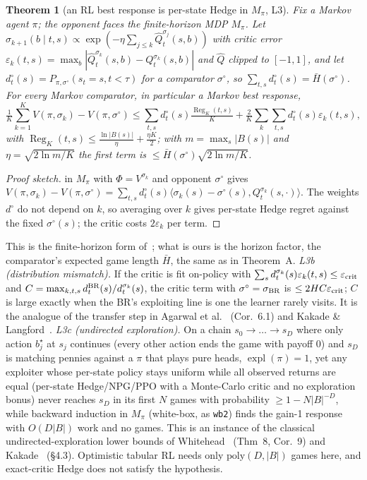 \documentclass[10pt]{article}
\theoremstyle{plain}
\newtheorem{theorem}{Theorem}
\theoremstyle{definition}
\theoremstyle{remark}
\newcommand{\Hbar}{\bar H}
\DeclareMathOperator{\expl}{expl}
\DeclareMathOperator{\Reg}{Reg}
\begin{document}
\begin{theorem}[an RL best response is per-state Hedge in $M_\pi$, L3]\label{thm:L3}
Fix a Markov agent $\pi$; the opponent faces the finite-horizon MDP $M_\pi$. Let $\sigma_{k+1}(b\mid t,s)\propto\exp(-\eta\sum_{j\le k}\hat Q^{\sigma_j}_t(s,b))$ with critic error $\varepsilon_k(t,s)=\max_b|\hat Q^{\sigma_k}_t(s,b)-Q^{\sigma_k}_t(s,b)|$ and $\hat Q$ clipped to $[-1,1]$, and let $d^\circ_t(s)=P_{\pi,\sigma^\circ}(s_t=s,t<\tau)$ for a comparator $\sigma^\circ$, so $\sum_{t,s}d^\circ_t(s)=\Hbar(\sigma^\circ)$. For every Markov comparator, in particular a Markov best response,
\[\tfrac1K\sum_{k=1}^KV(\pi,\sigma_k)-V(\pi,\sigma^\circ)\le\sum_{t,s}d^\circ_t(s)\tfrac{\Reg_K(t,s)}{K}+\tfrac2K\sum_k\sum_{t,s}d^\circ_t(s)\varepsilon_k(t,s),\]
with $\Reg_K(t,s)\le\frac{\ln|B(s)|}\eta+\frac{\eta K}2$; with $m=\max_s|B(s)|$ and $\eta=\sqrt{2\ln m/K}$ the first term is $\le\Hbar(\sigma^\circ)\sqrt{2\ln m/K}$.
\end{theorem}
\begin{proof}[Proof sketch]
 in $M_\pi$ with $\Phi=V^{\sigma_k}$ and opponent $\sigma^\circ$ gives $V(\pi,\sigma_k)-V(\pi,\sigma^\circ)=\sum_{t,s}d^\circ_t(s)\langle\sigma_k(s)-\sigma^\circ(s),Q^{\sigma_k}_t(s,\cdot)\rangle$. The weights $d^\circ$ do not depend on $k$, so averaging over $k$ gives per-state Hedge regret against the fixed $\sigma^\circ(s)$; the critic costs $2\varepsilon_k$ per term.
\end{proof}
This is the finite-horizon form of~\cite{EKM09,Aga21}; what is ours is the horizon factor, the comparator's expected game length $\Hbar$, the same as in Theorem~A.
\emph{L3b (distribution mismatch).} If the critic is fit on-policy with $\sum_sd^{\sigma_k}_t(s)\varepsilon_k(t,s)\le\varepsilon_{\rm crit}$ and $C=\max_{k,t,s}d^{\rm BR}_t(s)/d^{\sigma_k}_t(s)$, the critic term with $\sigma^\circ=\sigma_{\rm BR}$ is $\le2HC\varepsilon_{\rm crit}$; $C$ is large exactly when the BR's exploiting line is one the learner rarely visits. It is the analogue of the transfer step in Agarwal et al.~\cite{Aga21} (Cor.~6.1) and Kakade \& Langford~\cite{KL02}.
\emph{L3c (undirected exploration).} On a chain $s_0\to\dots\to s_D$ where only action $b^\star_j$ at $s_j$ continues (every other action ends the game with payoff $0$) and $s_D$ is matching pennies against a $\pi$ that plays pure heads, $\expl(\pi)=1$, yet any exploiter whose per-state policy stays uniform while all observed returns are equal (per-state Hedge/NPG/PPO with a Monte-Carlo critic and no exploration bonus) never reaches $s_D$ in its first $N$ games with probability $\ge1-N|B|^{-D}$, while backward induction in $M_\pi$ (white-box, as \texttt{wb2}) finds the gain-1 response with $O(D|B|)$ work and no games. This is an instance of the classical undirected-exploration lower bounds of Whitehead~\cite{Whi91} (Thm~8, Cor.~9) and Kakade~\cite{Kak03} (\S4.3). Optimistic tabular RL needs only $\mathrm{poly}(D,|B|)$ games here, and exact-critic Hedge does not satisfy the hypothesis.
\end{document}
